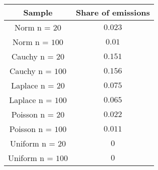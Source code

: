 \begin{tabular}{|c|c|}
\hline
Sample & Share of emissions \\
\hline
Norm n = $20$ & $0.023$\\
\hline
Norm n = $100$ & $0.01$\\
\hline
Cauchy n = $20$ & $0.151$\\
\hline
Cauchy n = $100$ & $0.156$\\
\hline
Laplace n = $20$ & $0.075$\\
\hline
Laplace n = $100$ & $0.065$\\
\hline
Poisson n = $20$ & $0.022$\\
\hline
Poisson n = $100$ & $0.011$\\
\hline
Uniform n = $20$ & $0$\\
\hline
Uniform n = $100$ & $0$\\
\hline
\end{tabular}